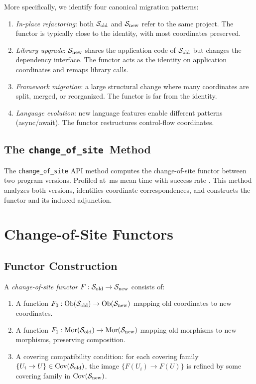 \documentclass[11pt]{article}
\newcommand{\ChangeOfSite}{\texttt{change\_of\_site}}
\newcommand{\SiteOld}{\Site_{\mathrm{old}}}
\newcommand{\SiteNew}{\Site_{\mathrm{new}}}
\newcommand{\FunctorF}{F}
\begin{document}
More specifically, we identify four canonical migration patterns:
\begin{enumerate}[noitemsep]
  \item \emph{In-place refactoring}: both $\SiteOld$ and $\SiteNew$ refer
        to the same project.  The functor is typically close to the identity,
        with most coordinates preserved.
  \item \emph{Library upgrade}: $\SiteNew$ shares the application code of
        $\SiteOld$ but changes the dependency interface.  The functor acts
        as the identity on application coordinates and remaps library calls.
  \item \emph{Framework migration}: a large structural change where many
        coordinates are split, merged, or reorganized.  The functor is far
        from the identity.
  \item \emph{Language evolution}: new language features enable different
        patterns (\eg async/await).  The functor restructures control-flow
        coordinates.
\end{enumerate}

\subsection{The \ChangeOfSite\ Method}
The \texttt{change\_of\_site} API method computes the change-of-site functor
between two program versions.  Profiled at \compProfChangeOfSiteMeanMs\,ms
mean time with success rate \compProfChangeOfSiteRate.  This method analyzes
both versions, identifies coordinate correspondences, and constructs the
functor and its induced adjunction.

\section{Change-of-Site Functors}\label{sec:cos-functor}

\subsection{Functor Construction}

\begin{definition}\label{def:cos-functor}
A \emph{change-of-site functor} $\FunctorF : \SiteOld \to \SiteNew$
consists of:
\begin{enumerate}[noitemsep]
  \item A function $\FunctorF_0 : \Ob(\SiteOld) \to \Ob(\SiteNew)$
        mapping old coordinates to new coordinates.
  \item A function $\FunctorF_1 : \Mor(\SiteOld) \to \Mor(\SiteNew)$
        mapping old morphisms to new morphisms, preserving composition.
  \item A covering compatibility condition: for each covering family
        $\{U_i \to U\} \in \Cov(\SiteOld)$, the image
        $\{\FunctorF(U_i) \to \FunctorF(U)\}$ is refined by some covering
        family in $\Cov(\SiteNew)$.
\end{enumerate}
\end{definition}
\end{document}

